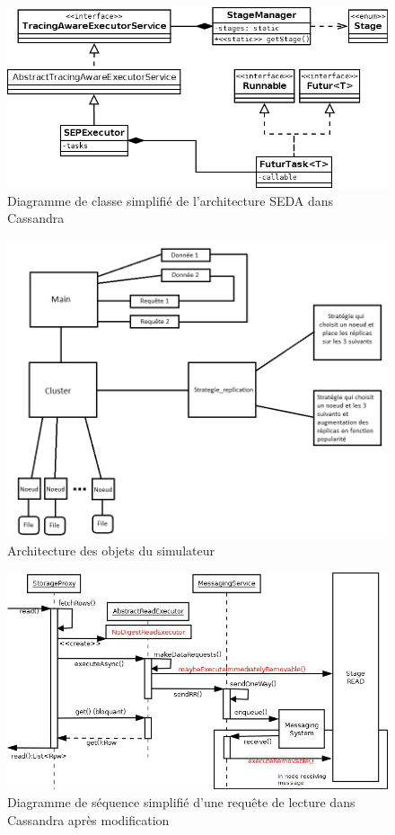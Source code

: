 \documentclass[12pt]{article}
\begin{document}

\begin{figure}[p]
	\centering
		\includegraphics[width=15cm]{images/architecture/stages_diagram.png}
	\caption{Diagramme de classe simplifié de l'architecture SEDA dans Cassandra \label{fig:stages_diagram}}
\end{figure}


\begin{figure}[H]
	\centering
        \includegraphics[width=12cm]{images/implementation/archiSimulateur.png}
    \caption{Architecture des objets du simulateur \label{fig:archisimulateur}}
\end{figure}

\begin{figure}[H]
	\centering
        \includegraphics[width=12cm]{images/implementation/read_diagram_modified.png}
    \caption{Diagramme de séquence simplifié d'une requête de lecture dans Cassandra après modification \label{fig:read_diagram_modified}}
\end{figure}
\end{document}
